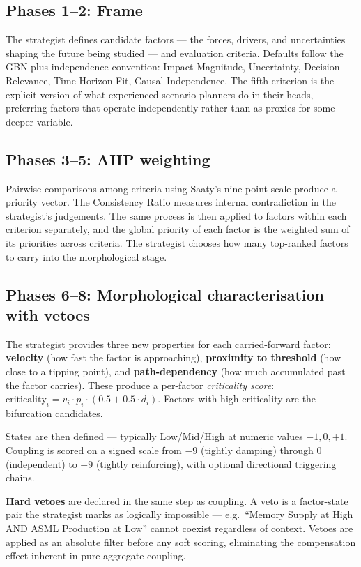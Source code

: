 \documentclass[11pt,a4paper]{article}
\begin{document}
\subsection{Phases 1--2: Frame}

The strategist defines candidate factors — the forces, drivers, and uncertainties shaping the future being studied — and evaluation criteria. Defaults follow the GBN-plus-independence convention: Impact Magnitude, Uncertainty, Decision Relevance, Time Horizon Fit, Causal Independence. The fifth criterion is the explicit version of what experienced scenario planners do in their heads, preferring factors that operate independently rather than as proxies for some deeper variable.

\subsection{Phases 3--5: AHP weighting}

Pairwise comparisons among criteria using Saaty's nine-point scale produce a priority vector. The Consistency Ratio measures internal contradiction in the strategist's judgements. The same process is then applied to factors within each criterion separately, and the global priority of each factor is the weighted sum of its priorities across criteria. The strategist chooses how many top-ranked factors to carry into the morphological stage.

\subsection{Phases 6--8: Morphological characterisation with vetoes}

The strategist provides three new properties for each carried-forward factor: \textbf{velocity} (how fast the factor is approaching), \textbf{proximity to threshold} (how close to a tipping point), and \textbf{path-dependency} (how much accumulated past the factor carries). These produce a per-factor \emph{criticality score}: $\text{criticality}_i = v_i \cdot p_i \cdot (0.5 + 0.5 \cdot d_i)$. Factors with high criticality are the bifurcation candidates.

States are then defined — typically Low/Mid/High at numeric values $-1, 0, +1$. Coupling is scored on a signed scale from $-9$ (tightly damping) through $0$ (independent) to $+9$ (tightly reinforcing), with optional directional triggering chains.

\textbf{Hard vetoes} are declared in the same step as coupling. A veto is a factor-state pair the strategist marks as logically impossible — e.g.\ ``Memory Supply at High AND ASML Production at Low'' cannot coexist regardless of context. Vetoes are applied as an absolute filter before any soft scoring, eliminating the compensation effect inherent in pure aggregate-coupling.
\end{document}
